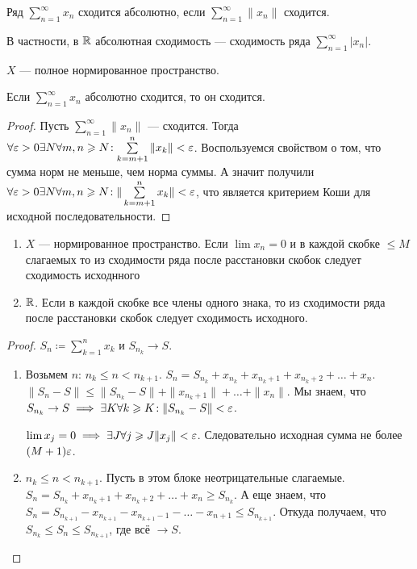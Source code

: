 \begin{definition}
    Ряд $\sum\limits_{n=1}^\infty x_n$ сходится абсолютно, если  $\sum\limits_{n=1}^\infty \|x_n\|$ сходится.
\end{definition}
\begin{remark}
    В частности, в $\mathbb{R}$ абсолютная сходимость --- сходимость ряда  $\sum\limits_{n=1}^\infty |x_n|$.
\end{remark}
\begin{theorem}
    $X$ --- полное нормированное пространство.

    Если  $\sum\limits_{n=1}^\infty x_n$ абсолютно сходится, то он сходится.
\end{theorem}
\begin{proof}
    Пусть $\sum\limits_{n=1}^\infty \|x_n\|$ --- сходится. Тогда  $\forall \varepsilon > 0 \exists N \forall m, n \geqslant N\!: \sum\limits_{k=m+1}^n \|x_k\| < \varepsilon$. Воспользуемся свойством о том, что сумма норм не меньше, чем норма суммы. А значит получили $\forall \varepsilon > 0 \exists N \forall m, n \geqslant N\!: \| \sum\limits_{k=m+1}^n x_k\| < \varepsilon$, что является критерием Коши для исходной последовательности.
\end{proof}
\begin{theorem}
    \begin{enumerate}
        \item $X$ --- нормированное пространство. Если  $\lim x_n = 0$ и в каждой скобке  $\le M$ слагаемых то из сходимости ряда после расстановки скобок следует сходимость исходнного
        \item $\mathbb{R}$. Если в каждой скобке все члены одного знака, то из сходимости ряда после расстановки скобок следует сходимость исходного.
    \end{enumerate}
\end{theorem}
\begin{proof}
    $S_n \coloneqq \sum\limits_{k=1}^n x_k$ и  $S_{n_k} \to S$.
     \begin{enumerate}
         \item Возьмем $n$:  $n_k \le n < n_{k+1}$. $S_n = S_{n_k} + x_{n_k} + x_{n_k + 1} + x_{n_k  + 2} + \ldots + x_n$. $\|S_n - S\| \le \|S_{n_k} - S\| + \|x_{n_k + 1}\| + \ldots + \|x_n\|$. Мы знаем, что $S_{n_k} \to S \implies \exists K \forall k \geqslant K\!: \|S_{n_k} - S\| < \varepsilon$.

             $\lim x_j = 0 \implies \exists J \forall j \geqslant J \|x_j\| < \varepsilon$. Следовательно исходная сумма не более $(M+1)\varepsilon$.
         \item  $n_k \le n < n_{k+1}$. Пусть в этом блоке неотрицательные слагаемые. $S_n = S_{n_k} + x_{n_k + 1} + x_{n_k + 2} + \ldots + x_n \ge S_{n_k}$. А еще знаем, что $S_n = S_{n_{k+1}} - x_{n_{k+1}} - x_{n_{k+1} - 1} - \ldots - x_{n+1} \le S_{n_{k+1}}$. Откуда получаем, что $S_{n_k} \le S_n \le S_{n_{k+1}}$, где всё $\to S$.
    \end{enumerate}
\end{proof}
